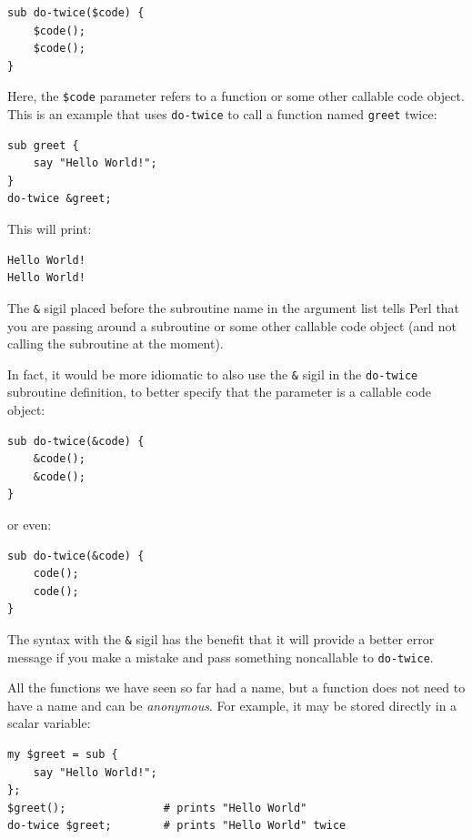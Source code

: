 \begin{verbatim}
sub do-twice($code) {
    $code(); 
    $code();
}
\end{verbatim}

Here, the \verb"$code" parameter refers to a function or some
other callable code object. This is an example that uses
\verb"do-twice" to call a function named \verb"greet" twice:

\begin{verbatim}
sub greet {
    say "Hello World!";
}
do-twice &greet;
\end{verbatim}

This will print:
\begin{verbatim}
Hello World!
Hello World!
\end{verbatim}

The \verb"&" sigil placed before the subroutine name in the 
argument list tells Perl that you are passing around a 
subroutine or some other callable code object (and not 
calling the subroutine at the moment).

In fact, it would be more idiomatic to also use the \verb"&" 
sigil in the \verb"do-twice" subroutine definition, to better 
specify that the parameter is a callable code object:

\begin{verbatim}
sub do-twice(&code) {
    &code(); 
    &code();
}
\end{verbatim}

or even:
\begin{verbatim}
sub do-twice(&code) {
    code(); 
    code();
}
\end{verbatim}

The syntax with the \verb"&" sigil has the benefit that 
it will provide a better error message if you make a mistake 
and pass something noncallable to \verb"do-twice". 

All the functions we have seen so far had a name, but a 
function does not need to have a name and can be \emph{anonymous}. 
For example, it may be stored directly in a scalar variable:

\begin{verbatim}
my $greet = sub {
    say "Hello World!";
};
$greet();               # prints "Hello World"
do-twice $greet;        # prints "Hello World" twice
\end{verbatim}

